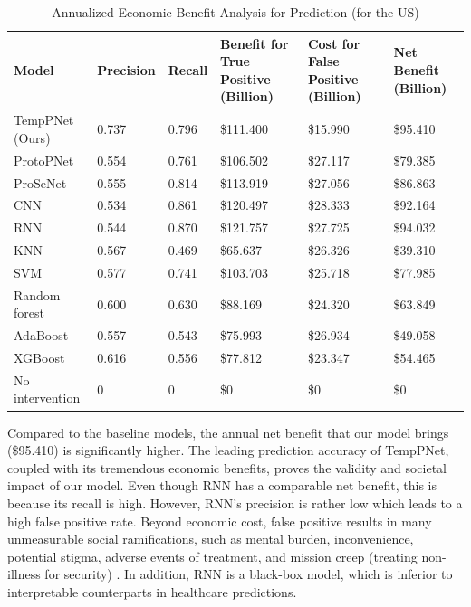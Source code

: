 \documentclass[mnsc]{informs3b} %
\begin{document}
\begin{table}[h]
\centering
\caption{Annualized Economic Benefit Analysis for Prediction (for the US)}
\label{tb:econ_benefit_analysis}
\small
\begin{threeparttable}
\begin{tabular}{L{80pt}C{40pt}C{40pt}C{80pt}C{80pt}C{60pt}}
\toprule
 Model & Precision & Recall & Benefit for True Positive (Billion) & Cost for False Positive (Billion) & Net Benefit (Billion) \\ \midrule
 TempPNet (Ours) & 0.737 & 0.796 & \$111.400 & \$15.990 & \$95.410 \\
 ProtoPNet & 0.554 & 0.761 & \$106.502 & \$27.117 &  \$79.385  \\
 ProSeNet & 0.555 & 0.814 & \$113.919 & \$27.056 &  \$86.863  \\
 CNN & 0.534 & 0.861 & \$120.497 & \$28.333 &  \$92.164 \\
 RNN & 0.544 & 0.870 & \$121.757 & \$27.725 &  \$94.032  \\
 KNN  & 0.567 & 0.469 & \$65.637 & \$26.326 &  \$39.310  \\
 SVM  & 0.577 & 0.741 & \$103.703 & \$25.718 & \$77.985   \\
 Random forest & 0.600 & 0.630 & \$88.169 & \$24.320 &  \$63.849 \\
 AdaBoost & 0.557 & 0.543 & \$75.993 & \$26.934 &  \$49.058   \\
 XGBoost & 0.616 & 0.556 & \$77.812 & \$23.347 &  \$54.465  \\
 No intervention  & 0 & 0 & \$0 & \$0 & \$0 \\
 \bottomrule
\end{tabular}
\end{threeparttable}
\end{table}

Compared to the baseline models, the annual net benefit that our model brings (\$95.410) is significantly higher. The leading prediction accuracy of TempPNet, coupled with its tremendous economic benefits, proves the validity and societal impact of our model. Even though RNN has a comparable net benefit, this is because its recall is high. However, RNN's precision is rather low which leads to a high false positive rate. Beyond economic cost, false positive results in many unmeasurable social ramifications, such as mental burden, inconvenience, potential stigma, adverse events of treatment, and mission creep (treating non-illness for security) \citep{martin_decision_2017}. In addition, RNN is a black-box model, which is inferior to interpretable counterparts in healthcare predictions.
\end{document}
